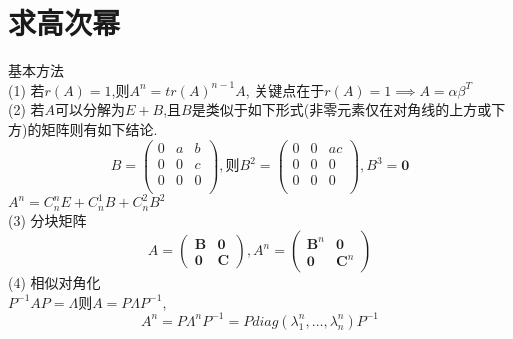 \documentclass[12pt, a4paper, oneside, UTF8]{ctexbook}
\begin{document}
\section{求高次幂}
\begin{remark}
    基本方法 \\
    (1) 若$r(A)=1$,则$A^n=tr(A)^{n-1}A$, 关键点在于$r(A)=1\implies A=\alpha\beta^T$ \\
    (2) 若$A$可以分解为$E+B$,且$B$是类似于如下形式(非零元素仅在对角线的上方或下方)的矩阵则有如下结论.
    \[
    B=\left(
    \begin{array}{ccc}
        0& a& b \\
        0& 0& c \\
        0& 0& 0 \\
    \end{array}\right),
    \text{则}B^2=\left(\begin{array}{ccc}
        0& 0& ac \\
        0& 0& 0 \\
        0& 0& 0 \\
    \end{array}\right), B^3 = \mathbf{0}
    \]
    $A^n=C_{n}^{n}E+C_{n}^{1}B+C_{n}^{2}B^2$ \\
    (3) 分块矩阵
    \[
        A=\left(\begin{array}{cc}
        \mathbf{B} & \mathbf{0} \\
        \mathbf{0} & \mathbf{C}
    \end{array}\right), 
    A^n=\left(\begin{array}{cc}
        \mathbf{B}^n & \mathbf{0} \\
        \mathbf{0} & \mathbf{C}^n
    \end{array}\right)
    \] 
    (4) 相似对角化 \\
    $P^{-1}AP=\Lambda$则$A=P\Lambda P^{-1}$,
    \[
    A^n=P\Lambda^n P^{-1}=P diag(\lambda_1^n,\ldots,\lambda_n^n)P^{-1}
    \]
\end{remark}
\end{document}
